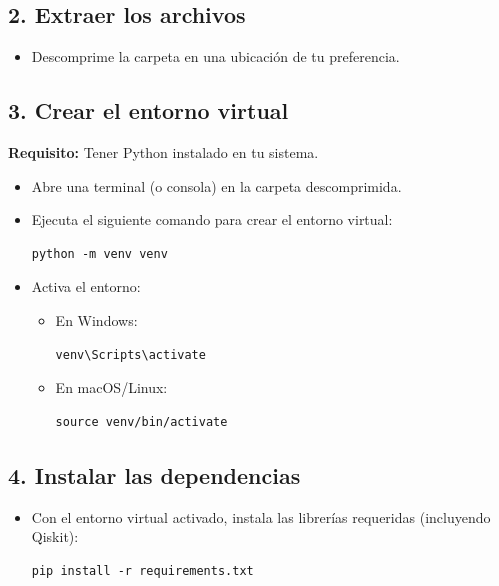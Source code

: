 \documentclass{article}
\begin{document}
\subsection*{2. Extraer los archivos}

\begin{itemize}
    \item Descomprime la carpeta en una ubicación de tu preferencia.
\end{itemize}

\subsection*{3. Crear el entorno virtual}

\textbf{Requisito:} Tener Python instalado en tu sistema.

\begin{itemize}
    \item Abre una terminal (o consola) en la carpeta descomprimida.
    \item Ejecuta el siguiente comando para crear el entorno virtual:

\begin{verbatim}
python -m venv venv
\end{verbatim}

    \item Activa el entorno:
    \begin{itemize}
        \item En Windows:
\begin{verbatim}
venv\Scripts\activate
\end{verbatim}
        \item En macOS/Linux:
\begin{verbatim}
source venv/bin/activate
\end{verbatim}
    \end{itemize}
\end{itemize}

\subsection*{4. Instalar las dependencias}

\begin{itemize}
    \item Con el entorno virtual activado, instala las librerías requeridas (incluyendo Qiskit):

\begin{verbatim}
pip install -r requirements.txt
\end{verbatim}

\end{itemize}
\end{document}
